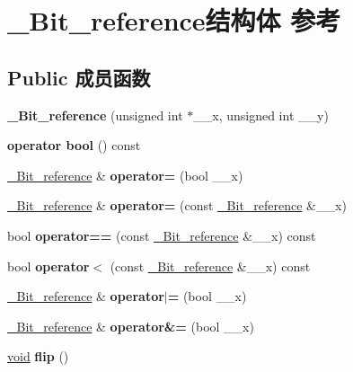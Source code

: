 \hypertarget{struct___bit__reference}{}\section{\+\_\+\+Bit\+\_\+reference结构体 参考}
\label{struct___bit__reference}
\subsection*{Public 成员函数}
\begin{DoxyCompactItemize}
\item 
\mbox{\label{struct___bit__reference_a734ddccb066e562a355ee2819e9c87d5}} 
{\bfseries \+\_\+\+Bit\+\_\+reference} (unsigned int $\ast$\+\_\+\+\_\+x, unsigned int \+\_\+\+\_\+y)
\item 
\mbox{\label{struct___bit__reference_ac654c16bdda353d21a73d3d1f82cbba0}} 
{\bfseries operator bool} () const
\item 
\mbox{\label{struct___bit__reference_acdf6198a3c332b93639ca3e0b52672da}} 
\hyperlink{struct___bit__reference}{\+\_\+\+Bit\+\_\+reference} \& {\bfseries operator=} (bool \+\_\+\+\_\+x)
\item 
\mbox{\label{struct___bit__reference_aa02f2858251c3042a3b2be3879f3166e}} 
\hyperlink{struct___bit__reference}{\+\_\+\+Bit\+\_\+reference} \& {\bfseries operator=} (const \hyperlink{struct___bit__reference}{\+\_\+\+Bit\+\_\+reference} \&\+\_\+\+\_\+x)
\item 
\mbox{\label{struct___bit__reference_ad9f4af8fd00ee05b4aece1e5f372a803}} 
bool {\bfseries operator==} (const \hyperlink{struct___bit__reference}{\+\_\+\+Bit\+\_\+reference} \&\+\_\+\+\_\+x) const
\item 
\mbox{\label{struct___bit__reference_a3a93e14780462cbfb1ca63df6bca9d97}} 
bool {\bfseries operator$<$} (const \hyperlink{struct___bit__reference}{\+\_\+\+Bit\+\_\+reference} \&\+\_\+\+\_\+x) const
\item 
\mbox{\label{struct___bit__reference_afe69e6acdc6edc235e5d3d0dd6dace9e}} 
\hyperlink{struct___bit__reference}{\+\_\+\+Bit\+\_\+reference} \& {\bfseries operator$\vert$=} (bool \+\_\+\+\_\+x)
\item 
\mbox{\label{struct___bit__reference_ad35b8961849e2c93477561722aafde64}} 
\hyperlink{struct___bit__reference}{\+\_\+\+Bit\+\_\+reference} \& {\bfseries operator\&=} (bool \+\_\+\+\_\+x)
\item 
\mbox{\label{struct___bit__reference_acf72e857e9ee13e4bdcd71079a85d30d}} 
\hyperlink{interfacevoid}{void} {\bfseries flip} ()
\end{DoxyCompactItemize}
